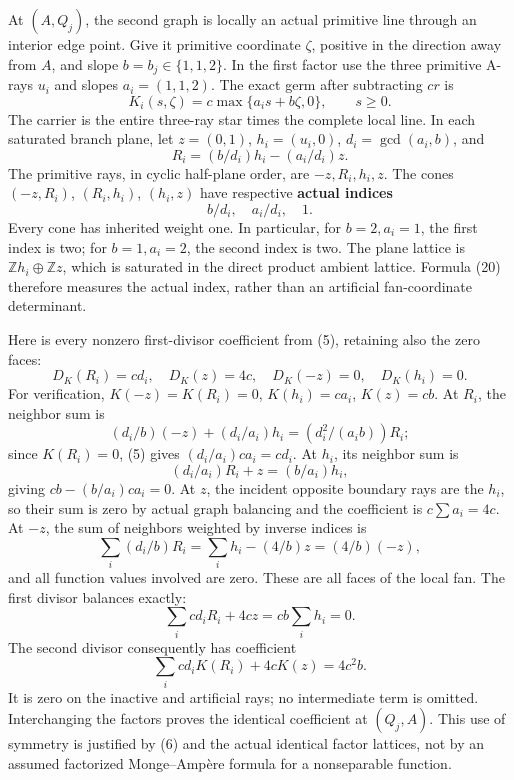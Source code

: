 \documentclass[
  10pt,
]{article}
\begin{document}
At \((A,Q_j)\), the second graph is locally an actual primitive line
through an interior edge point. Give it primitive coordinate \(\zeta\),
positive in the direction away from \(A\), and slope
\(b=b_j\in\{1,1,2\}\). In the first factor use the three primitive
A-rays \(u_i\) and slopes \(a_i=(1,1,2)\). The exact germ after
subtracting \(cr\) is \[
 K_i(s,\zeta)=c\max\{a_i s+b\zeta,0\},\qquad s\geq0.          \tag{18}
\] The carrier is the entire three-ray star times the complete local
line. In each saturated branch plane, let \(z=(0,1)\), \(h_i=(u_i,0)\),
\(d_i=\gcd(a_i,b)\), and \[
 R_i=(b/d_i)h_i-(a_i/d_i)z.                                 \tag{19}
\] The primitive rays, in cyclic half-plane order, are \(-z,R_i,h_i,z\).
The cones \((-z,R_i)\), \((R_i,h_i)\), \((h_i,z)\) have respective
\textbf{actual indices} \[
 b/d_i,\quad a_i/d_i,\quad1.                                \tag{20}
\] Every cone has inherited weight one. In particular, for
\(b=2,a_i=1\), the first index is two; for \(b=1,a_i=2\), the second
index is two. The plane lattice is \(\mathbb Zh_i\oplus\mathbb Zz\),
which is saturated in the direct product ambient lattice. Formula (20)
therefore measures the actual index, rather than an artificial
fan-coordinate determinant.

Here is every nonzero first-divisor coefficient from (5), retaining also
the zero faces: \[
 D_K(R_i)=c d_i,\quad D_K(z)=4c,\quad
 D_K(-z)=0,\quad D_K(h_i)=0.                                \tag{21}
\] For verification, \(K(-z)=K(R_i)=0\), \(K(h_i)=ca_i\), \(K(z)=cb\).
At \(R_i\), the neighbor sum is \[
 (d_i/b)(-z)+(d_i/a_i)h_i=(d_i^2/(a_ib))R_i;
\] since \(K(R_i)=0\), (5) gives \((d_i/a_i)ca_i=cd_i\). At \(h_i\), its
neighbor sum is \[
 (d_i/a_i)R_i+z=(b/a_i)h_i,
\] giving \(cb-(b/a_i)ca_i=0\). At \(z\), the incident opposite boundary
rays are the \(h_i\), so their sum is zero by actual graph balancing and
the coefficient is \(c\sum a_i=4c\). At \(-z\), the sum of neighbors
weighted by inverse indices is \[
 \sum_i(d_i/b)R_i=\sum_i h_i-(4/b)z=(4/b)(-z),
\] and all function values involved are zero. These are all faces of the
local fan. The first divisor balances exactly: \[
 \sum_i cd_iR_i+4cz=cb\sum_i h_i=0.
\] The second divisor consequently has coefficient \[
 \sum_i cd_iK(R_i)+4cK(z)=4c^2b.                            \tag{22}
\] It is zero on the inactive and artificial rays; no intermediate term
is omitted. Interchanging the factors proves the identical coefficient
at \((Q_j,A)\). This use of symmetry is justified by (6) and the actual
identical factor lattices, not by an assumed factorized Monge--Ampère
formula for a nonseparable function.
\end{document}
